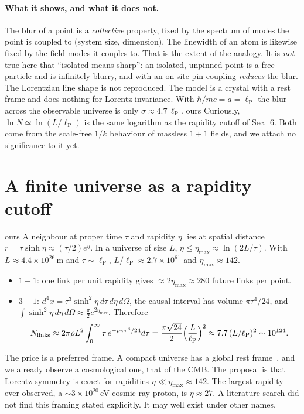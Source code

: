 \documentclass[11pt,a4paper]{article}
\newcommand{\tagbox}[2]{\textsf{\scriptsize\colorbox{#1!12}{\textcolor{#1!70!black}{#2}}}}
\newcommand{\ours}{\tagbox{orange}{ours}}
\newcommand{\lP}{\ell_{\mathrm P}}
\begin{document}
\paragraph{What it shows, and what it does not.} The blur of a point is a \emph{collective} property, fixed by the spectrum of modes the point is coupled to (system size, dimension). The linewidth of an atom is likewise fixed by the field modes it couples to. That is the extent of the analogy. It is \emph{not} true here that ``isolated means sharp'': an isolated, unpinned point is a free particle and is infinitely blurry, and with an on-site pin coupling \emph{reduces} the blur. The Lorentzian line shape is not reproduced. The model is a crystal with a rest frame and does nothing for Lorentz invariance. With $\hbar/mc=a=\lP$ the blur across the observable universe is only $\sigma\approx4.7\,\lP$. \ours{} Curiously, $\ln N\simeq\ln(L/\lP)$ is the same logarithm as the rapidity cutoff of Sec.~6. Both come from the scale-free $1/k$ behaviour of massless $1+1$ fields, and we attach no significance to it yet.

\section{A finite universe as a rapidity cutoff}
\ours{} A neighbour at proper time $\tau$ and rapidity $\eta$ lies at spatial distance $r=\tau\sinh\eta\approx(\tau/2)e^\eta$. In a universe of size $L$, $\eta\le\eta_{\max}\approx\ln(2L/\tau)$. With $L\approx4.4\times10^{26}$\,m and $\tau\sim\lP$, $L/\lP\approx2.7\times10^{61}$ and $\eta_{\max}\approx142$.
\begin{itemize}[leftmargin=*]
\item $1+1$: one link per unit rapidity gives $\approx2\eta_{\max}\approx280$ future links per point.
\item $3+1$: $d^4x=\tau^3\sinh^2\!\eta\,d\tau\,d\eta\,d\Omega$, the causal interval has volume $\pi\tau^4/24$, and $\int\sinh^2\eta\,d\eta\,d\Omega\approx\frac\pi2e^{2\eta_{\max}}$. Therefore
\begin{equation}
N_{\rm links}\approx2\pi\rho L^2\int_0^\infty\tau\,e^{-\rho\pi\tau^4/24}d\tau=\frac{\pi\sqrt{24}}{2}\Big(\frac{L}{\lP}\Big)^2\approx7.7\,(L/\lP)^2\sim10^{124}.
\end{equation}
\end{itemize}
The price is a preferred frame. A compact universe has a global rest frame~\cite{BarrowLevin01}, and we already observe a cosmological one, that of the CMB. The proposal is that Lorentz symmetry is exact for rapidities $\eta\ll\eta_{\max}\approx142$. The largest rapidity ever observed, a $\sim3\times10^{20}$\,eV cosmic-ray proton, is $\eta\approx27$. A literature search did not find this framing stated explicitly. It may well exist under other names.
\end{document}
